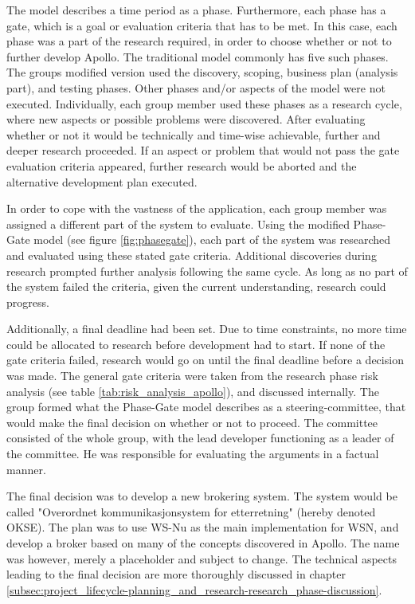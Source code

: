 The model describes a time period as a phase. Furthermore, each phase has a gate, which is a goal or evaluation criteria that has to be met. In this case, each phase was a part of the research required, in order to choose whether or not to further develop Apollo. The traditional model commonly has five such phases. The groups modified version used the discovery, scoping, business plan (analysis part), and testing phases. Other phases and/or aspects of the model were not executed. Individually, each group member used these phases as a research cycle, where new aspects or possible problems were discovered. After evaluating whether or not it would be technically and time-wise achievable, further and deeper research proceeded. If an aspect or problem that would not pass the gate evaluation criteria appeared, further research would be aborted and the alternative development plan executed.

In order to cope with the vastness of the application, each group member was assigned a different part of the system to evaluate. Using the modified Phase-Gate model (see figure \ref{fig:phasegate}), each part of the system was researched and evaluated using these stated gate criteria. Additional discoveries during research prompted further analysis following the same cycle. As long as no part of the system failed the criteria, given the current understanding, research could progress.

Additionally, a final deadline had been set. Due to time constraints, no more time could be allocated to research before development had to start. If none of the gate criteria failed, research would go on until the final deadline before a decision was made. The general gate criteria were taken from the research phase risk analysis (see table \ref{tab:risk_analysis_apollo}), and discussed internally. The group formed what the Phase-Gate model describes as a steering-committee, that would make the final decision on whether or not to proceed. The committee consisted of the whole group, with the lead developer functioning as a leader of the committee. He was responsible for evaluating the arguments in a factual manner. 

The final decision was to develop a new brokering system. The system would be called "Overordnet kommunikasjonsystem for etterretning" (hereby denoted OKSE). The plan was to use WS-Nu as the main implementation for WSN, and develop a broker based on many of the concepts discovered in Apollo. The name was however, merely a placeholder and subject to change. The technical aspects leading to the final decision are more thoroughly discussed in chapter \ref{subsec:project_lifecycle-planning_and_research-research_phase-discussion}.

